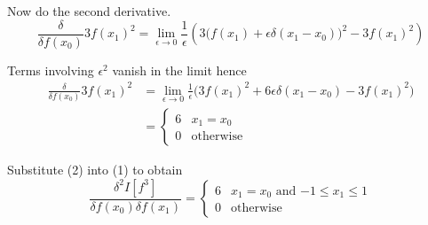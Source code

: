 \documentclass[12pt]{article}
\begin{document}
Now do the second derivative.
\begin{equation*}
\frac{\delta}{\delta f(x_0)}3f(x_1)^2
=\lim_{\epsilon\rightarrow0}\frac{1}{\epsilon}
\left(
3\big(f(x_1)+\epsilon\delta(x_1-x_0)\big)^2-3f(x_1)^2
\right)
\end{equation*}

Terms involving $\epsilon^2$ vanish in the limit hence
\begin{align*}
\frac{\delta}{\delta f(x_0)}3f(x_1)^2
&=\lim_{\epsilon\rightarrow0}\frac{1}{\epsilon}
\big(
3f(x_1)^2+6\epsilon\delta(x_1-x_0)-3f(x_1)^2
\big)
\\
&=\begin{cases}
6 & x_1=x_0
\\
0 & \text{otherwise}
\end{cases}
\tag{2}
\end{align*}

Substitute (2) into (1) to obtain
\begin{equation*}
\frac{\delta^2 I[f^3]}{\delta f(x_0)\delta f(x_1)}
=\begin{cases}
6 & \text{$x_1=x_0$ and $-1\le x_1\le1$}
\\
0 & \text{otherwise}
\end{cases}
\end{equation*}
\end{document}
